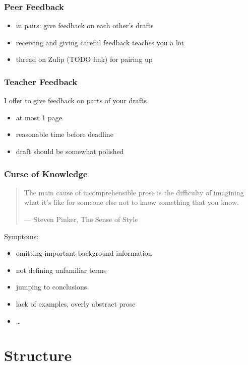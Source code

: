 \documentclass[xetex]{beamer}
\begin{document}
\begin{frame}
  \frametitle{Peer Feedback}

  \begin{itemize}
    \item in pairs: give feedback on each other's drafts
    \item receiving and giving careful feedback teaches you a lot
    \item thread on Zulip (TODO link) for pairing up
  \end{itemize}
\end{frame}

\begin{frame}
  \frametitle{Teacher Feedback}

  I offer to give feedback on parts of your drafts.

  \medskip

  \begin{itemize}
    \item at most 1 page
    \item reasonable time before deadline
    \item draft should be somewhat polished
  \end{itemize}
\end{frame}

\begin{frame}
  \frametitle{Curse of Knowledge}

  \begin{quote}
    The main cause of incomprehensible prose is the difficulty of imagining what it's like for someone else not to know something that you know.

    --- Steven Pinker, The Sense of Style
  \end{quote}

  \pause
  \medskip

  Symptoms:
  \begin{itemize}
    \item omitting important background information
    \item not defining unfamiliar terms
    \item jumping to conclusions
    \item lack of examples, overly abstract prose
    \item \dots
  \end{itemize}
\end{frame}

\section{Structure}
\end{document}
